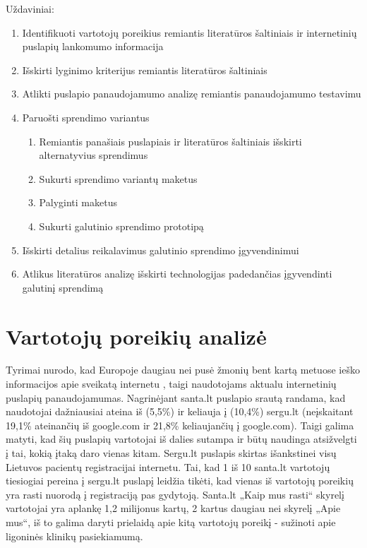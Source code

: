 \documentclass{VUMIFPSkursinis}
\begin{document}
Uždaviniai:
\begin{enumerate}
	\item Identifikuoti vartotojų poreikius remiantis literatūros šaltiniais ir internetinių puslapių lankomumo informacija
	\item Išskirti lyginimo kriterijus remiantis literatūros šaltiniais
	\item Atlikti puslapio panaudojamumo analizę remiantis panaudojamumo testavimu
	\item Paruošti sprendimo variantus
	\renewcommand*{\theenumii}{\theenumi.\arabic{enumii}}
	\renewcommand{\labelenumii}{\theenumii}
	\begin{enumerate}
		\item Remiantis panašiais puslapiais ir literatūros šaltiniais išskirti alternatyvius sprendimus
		\item Sukurti sprendimo variantų maketus
		\item Palyginti maketus
		\item Sukurti galutinio sprendimo prototipą
	\end{enumerate}
	\item Išskirti detalius reikalavimus galutinio sprendimo įgyvendinimui
	\item Atlikus literatūros analizę išskirti technologijas padedančias įgyvendinti galutinį sprendimą
\end{enumerate}

\section{Vartotojų poreikių analizė}
Tyrimai nurodo, kad Europoje daugiau nei pusė žmonių bent kartą metuose ieško informacijos apie sveikatą internetu \cite{EuCitizDigHealthEn}, taigi naudotojams aktualu internetinių puslapių panaudojamumas. Nagrinėjant santa.lt puslapio srautą randama, kad naudotojai dažniausiai ateina iš (5,5\%) ir keliauja į (10,4\%) sergu.lt (neįskaitant 19,1\% ateinančių iš google.com ir 21,8\% keliaujančių į google.com)\cite{AlexaSantaEn}. Taigi galima matyti, kad šių puslapių vartotojai iš dalies sutampa ir būtų naudinga atsižvelgti į tai, kokią įtaką daro vienas kitam. Sergu.lt puslapis skirtas išankstinei visų Lietuvos pacientų registracijai internetu. Tai, kad 1 iš 10 santa.lt vartotojų tiesiogiai pereina į sergu.lt puslapį leidžia tikėti, kad vienas iš vartotojų poreikių yra rasti nuorodą į registraciją pas gydytoją. Santa.lt „Kaip mus rasti“ skyrelį vartotojai yra aplankę 1,2 milijonus kartų\cite{VulSkKaipMusRastiLt}, 2 kartus daugiau nei skyrelį „Apie mus“\cite{VulSkApieMusLt}, iš to galima daryti prielaidą apie kitą vartotojų poreikį - sužinoti apie ligoninės klinikų pasiekiamumą.
\end{document}
